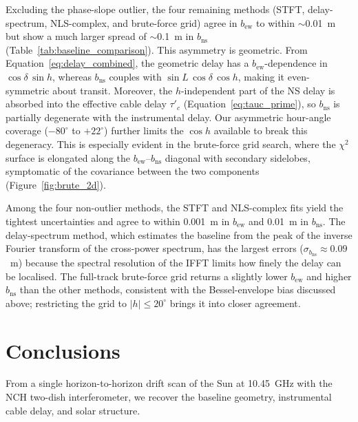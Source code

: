 \documentclass[10pt,preprint2]{aastex}
\begin{document}
Excluding the phase-slope outlier, the four remaining methods (STFT, delay-spectrum, NLS-complex, and brute-force grid) agree in $b_{\mathrm{ew}}$ to within $\sim$0.01~m but show a much larger spread of $\sim$0.1~m in $b_{\mathrm{ns}}$ (Table~\ref{tab:baseline_comparison}). This asymmetry is geometric. From Equation~\eqref{eq:delay_combined}, the geometric delay has a $b_{\mathrm{ew}}$-dependence in $\cos\delta\,\sin h$, whereas $b_{\mathrm{ns}}$ couples with $\sin L\,\cos\delta\,\cos h$, making it even-symmetric about transit. Moreover, the $h$-independent part of the NS delay is absorbed into the effective cable delay $\tau'_c$ (Equation~\ref{eq:tauc_prime}), so $b_{\mathrm{ns}}$ is partially degenerate with the instrumental delay. Our asymmetric hour-angle coverage ($-80^\circ$ to $+22^\circ$) further limits the $\cos h$ available to break this degeneracy. This is especially evident in the brute-force grid search, where the $\chi^2$ surface is elongated along the $b_{\mathrm{ew}}$--$b_{\mathrm{ns}}$ diagonal with secondary sidelobes, symptomatic of the covariance between the two components (Figure~\ref{fig:brute_2d}).

Among the four non-outlier methods, the STFT and NLS-complex fits yield the tightest uncertainties and agree to within 0.001~m in $b_{\mathrm{ew}}$ and 0.01~m in $b_{\mathrm{ns}}$. The delay-spectrum method, which estimates the baseline from the peak of the inverse Fourier transform of the cross-power spectrum, has the largest errors ($\sigma_{b_\mathrm{ns}} \approx 0.09$~m) because the spectral resolution of the IFFT limits how finely the delay can be localised. The full-track brute-force grid returns a slightly lower $b_{\mathrm{ew}}$ and higher $b_{\mathrm{ns}}$ than the other methods, consistent with the Bessel-envelope bias discussed above; restricting the grid to $|h| \leq 20^\circ$ brings it into closer agreement.

\section{Conclusions}
\label{sec:conclusions}

From a single horizon-to-horizon drift scan of the Sun at 10.45~GHz with the NCH two-dish interferometer, we recover the baseline geometry, instrumental cable delay, and solar structure.
\end{document}
